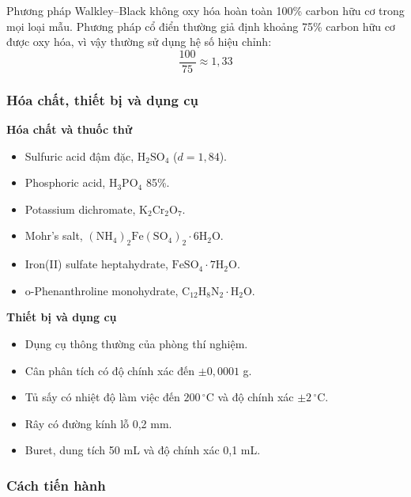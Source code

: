 Phương pháp Walkley--Black không oxy hóa hoàn toàn 100\% carbon hữu cơ trong mọi loại mẫu. 
Phương pháp cổ điển thường giả định khoảng 75\% carbon hữu cơ được oxy hóa, vì vậy thường sử dụng hệ số hiệu chỉnh:
\[
  \frac{100}{75} \approx 1{,}33
\]

\subsubsection{Hóa chất, thiết bị và dụng cụ}
\noindent\textbf{Hóa chất và thuốc thử}
\begin{itemize}
  \item Sulfuric acid đậm đặc, \(\mathrm{H_2SO_4}\) ($d = 1{,}84$).
  \item Phosphoric acid, \(\mathrm{H_3PO_4}\) 85\%.
  \item Potassium dichromate, \(\mathrm{K_2Cr_2O_7}\).
  \item Mohr's salt, \(\mathrm{(NH_4)_2Fe(SO_4)_2\cdot 6H_2O}\).
  \item Iron(II) sulfate heptahydrate, \(\mathrm{FeSO_4\cdot 7H_2O}\).
  \item o-Phenanthroline monohydrate, \(\mathrm{C_{12}H_8N_2\cdot H_2O}\).
\end{itemize}

\noindent\textbf{Thiết bị và dụng cụ}
\begin{itemize}
  \item Dụng cụ thông thường của phòng thí nghiệm.
  \item Cân phân tích có độ chính xác đến $\pm0{,}0001$ g.
  \item Tủ sấy có nhiệt độ làm việc đến $200\,^{\circ}\mathrm{C}$ và độ chính xác $\pm2\,^{\circ}\mathrm{C}$.
  \item Rây có đường kính lỗ 0,2 mm.
  \item Buret, dung tích 50 mL và độ chính xác 0,1 mL.
\end{itemize}

\subsubsection{Cách tiến hành}

